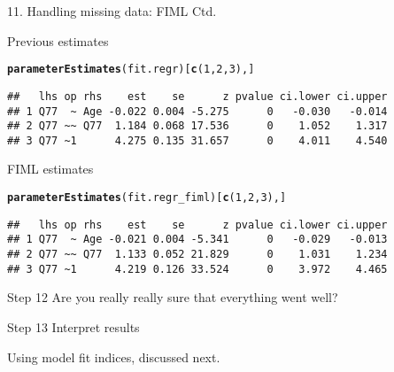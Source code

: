 \documentclass[10pt]{beamer}\usepackage[]{graphicx}\usepackage[]{xcolor}
\makeatletter
\newcommand{\hlnum}[1]{\textcolor[rgb]{0.686,0.059,0.569}{#1}}%
\newcommand{\hldef}[1]{\textcolor[rgb]{0.345,0.345,0.345}{#1}}%
\newcommand{\hlkwd}[1]{\textcolor[rgb]{0.737,0.353,0.396}{\textbf{#1}}}%
\newenvironment{kframe}{%
 \def\at@end@of@kframe{}%
 \ifinner\ifhmode%
  \def\at@end@of@kframe{\end{minipage}}%
  \begin{minipage}{\columnwidth}%
 \fi\fi%
 \def\FrameCommand##1{\hskip\@totalleftmargin \hskip-\fboxsep
 \colorbox{shadecolor}{##1}\hskip-\fboxsep
     \hskip-\linewidth \hskip-\@totalleftmargin \hskip\columnwidth}%
 \MakeFramed {\advance\hsize-\width
   \@totalleftmargin\z@ \linewidth\hsize
   \@setminipage}}%
 {\par\unskip\endMakeFramed%
 \at@end@of@kframe}
\newenvironment{knitrout}{}{} %
\makeatother
\begin{document}
%
\begin{frame}[fragile]{11. Handling missing data: FIML Ctd.}

Previous estimates 
\begin{knitrout}
\color{fgcolor}\begin{kframe}
\begin{alltt}
\hlkwd{parameterEstimates}\hldef{(fit.regr)[}\hlkwd{c}\hldef{(}\hlnum{1}\hldef{,}\hlnum{2}\hldef{,}\hlnum{3}\hldef{),]}
\end{alltt}
\begin{verbatim}
##   lhs op rhs    est    se      z pvalue ci.lower ci.upper
## 1 Q77  ~ Age -0.022 0.004 -5.275      0   -0.030   -0.014
## 2 Q77 ~~ Q77  1.184 0.068 17.536      0    1.052    1.317
## 3 Q77 ~1      4.275 0.135 31.657      0    4.011    4.540
\end{verbatim}
\end{kframe}
\end{knitrout}

FIML estimates
\begin{knitrout}
\color{fgcolor}\begin{kframe}
\begin{alltt}
\hlkwd{parameterEstimates}\hldef{(fit.regr_fiml)[}\hlkwd{c}\hldef{(}\hlnum{1}\hldef{,}\hlnum{2}\hldef{,}\hlnum{3}\hldef{),]}
\end{alltt}
\begin{verbatim}
##   lhs op rhs    est    se      z pvalue ci.lower ci.upper
## 1 Q77  ~ Age -0.021 0.004 -5.341      0   -0.029   -0.013
## 2 Q77 ~~ Q77  1.133 0.052 21.829      0    1.031    1.234
## 3 Q77 ~1      4.219 0.126 33.524      0    3.972    4.465
\end{verbatim}
\end{kframe}
\end{knitrout}

\end{frame}
%
\begin{frame}{Step 12}
\Large Are you really really sure that everything went well?
\end{frame}
%
\begin{frame}{Step 13}
\Large{Interpret results}

\vspace{5mm}

\normalsize{Using model fit indices, discussed next.}

\end{frame}
%
\end{document}
